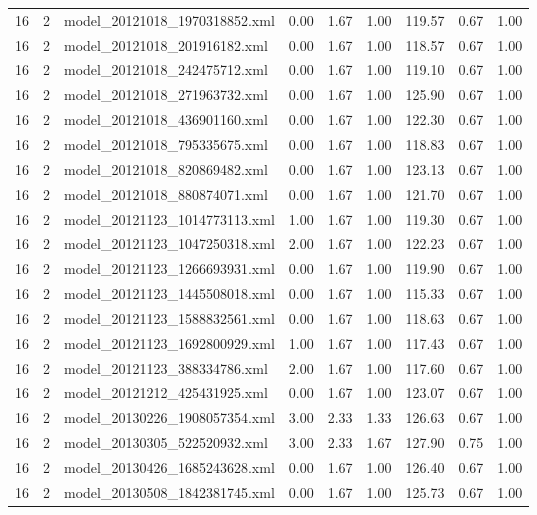 \begin{table}[ht]
\begin{tabular}{rrlrrrrrr}
   16 &   2 & model\_20121018\_1970318852.xml & 0.00 & 1.67 & 1.00 & 119.57 & 0.67 & 1.00 \\ 
   16 &   2 & model\_20121018\_201916182.xml & 0.00 & 1.67 & 1.00 & 118.57 & 0.67 & 1.00 \\ 
   16 &   2 & model\_20121018\_242475712.xml & 0.00 & 1.67 & 1.00 & 119.10 & 0.67 & 1.00 \\ 
   16 &   2 & model\_20121018\_271963732.xml & 0.00 & 1.67 & 1.00 & 125.90 & 0.67 & 1.00 \\ 
   16 &   2 & model\_20121018\_436901160.xml & 0.00 & 1.67 & 1.00 & 122.30 & 0.67 & 1.00 \\ 
   16 &   2 & model\_20121018\_795335675.xml & 0.00 & 1.67 & 1.00 & 118.83 & 0.67 & 1.00 \\ 
   16 &   2 & model\_20121018\_820869482.xml & 0.00 & 1.67 & 1.00 & 123.13 & 0.67 & 1.00 \\ 
   16 &   2 & model\_20121018\_880874071.xml & 0.00 & 1.67 & 1.00 & 121.70 & 0.67 & 1.00 \\ 
   16 &   2 & model\_20121123\_1014773113.xml & 1.00 & 1.67 & 1.00 & 119.30 & 0.67 & 1.00 \\ 
   16 &   2 & model\_20121123\_1047250318.xml & 2.00 & 1.67 & 1.00 & 122.23 & 0.67 & 1.00 \\ 
   16 &   2 & model\_20121123\_1266693931.xml & 0.00 & 1.67 & 1.00 & 119.90 & 0.67 & 1.00 \\ 
   16 &   2 & model\_20121123\_1445508018.xml & 0.00 & 1.67 & 1.00 & 115.33 & 0.67 & 1.00 \\ 
   16 &   2 & model\_20121123\_1588832561.xml & 0.00 & 1.67 & 1.00 & 118.63 & 0.67 & 1.00 \\ 
   16 &   2 & model\_20121123\_1692800929.xml & 1.00 & 1.67 & 1.00 & 117.43 & 0.67 & 1.00 \\ 
   16 &   2 & model\_20121123\_388334786.xml & 2.00 & 1.67 & 1.00 & 117.60 & 0.67 & 1.00 \\ 
   16 &   2 & model\_20121212\_425431925.xml & 0.00 & 1.67 & 1.00 & 123.07 & 0.67 & 1.00 \\ 
   16 &   2 & model\_20130226\_1908057354.xml & 3.00 & 2.33 & 1.33 & 126.63 & 0.67 & 1.00 \\ 
   16 &   2 & model\_20130305\_522520932.xml & 3.00 & 2.33 & 1.67 & 127.90 & 0.75 & 1.00 \\ 
   16 &   2 & model\_20130426\_1685243628.xml & 0.00 & 1.67 & 1.00 & 126.40 & 0.67 & 1.00 \\ 
   16 &   2 & model\_20130508\_1842381745.xml & 0.00 & 1.67 & 1.00 & 125.73 & 0.67 & 1.00 \\ 

\end{tabular}
\end{table}
